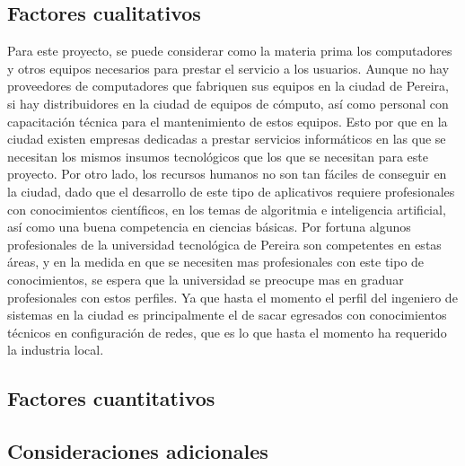 \documentclass[a4paper, 12pt, oneside]{article}
\begin{document}
	\subsection{Factores cualitativos}
	Para este proyecto, se puede considerar como la materia prima los computadores y otros equipos necesarios para prestar el servicio a los usuarios. Aunque no hay proveedores de computadores que fabriquen sus equipos en la ciudad de Pereira, si hay distribuidores en la ciudad de equipos de cómputo, así como personal con capacitación técnica para el mantenimiento de estos equipos. Esto por que en la ciudad existen empresas dedicadas a prestar servicios informáticos en las que se necesitan los mismos insumos tecnológicos que los que se necesitan para este proyecto.
	Por otro lado, los recursos humanos no son tan fáciles de conseguir en la ciudad, dado que el desarrollo de este tipo de aplicativos requiere profesionales con conocimientos científicos, en los temas de algoritmia e inteligencia artificial, así como una buena competencia en ciencias básicas. Por fortuna algunos profesionales de la universidad tecnológica de Pereira son competentes en estas áreas, y en la medida en que se necesiten mas profesionales con este tipo de conocimientos, se espera que la universidad se preocupe mas en graduar profesionales con estos perfiles. Ya que hasta el momento el perfil del ingeniero de sistemas en la ciudad es principalmente el de sacar egresados con conocimientos técnicos en configuración de redes, que es lo que hasta el momento ha requerido la industria local.
	
	\subsection{Factores cuantitativos}
	
	\clearpage

	\begin{center}
	\section{Consideraciones adicionales}
	\end{center}
\end{document}
